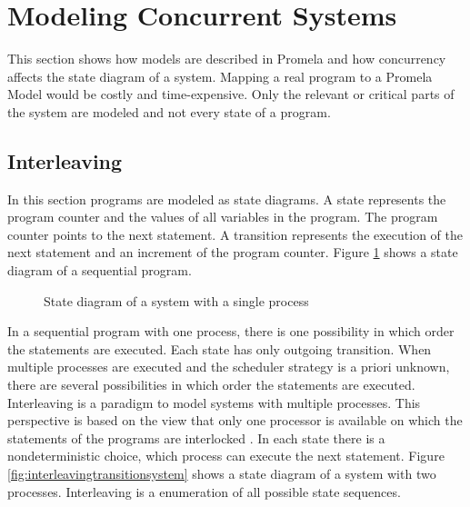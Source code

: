 \documentclass[a4paper, twoside]{article}
\begin{document}
\section{Modeling Concurrent Systems}
\label{sec:concurrency}

This section shows how models are described in Promela and how concurrency affects the state diagram of a system. Mapping a real program to a Promela Model would be costly and time-expensive. Only the relevant or critical parts of the system are modeled and not every state of a program.


\subsection{Interleaving}
\label{sec:interleaving}

In this section programs are modeled as state diagrams. A state represents the program counter and the values of all variables in the program. The program counter points to the next statement. A transition represents the execution of the next statement and an increment of the program counter. Figure \ref{fig:sequencielstatediagram} shows a state diagram of a sequential program. 

\begin{figure}
 \centering

  \caption{State diagram of a system with a single process}
  \label{fig:sequencielstatediagram}
\end{figure}

In a sequential program with one process, there is one possibility in which order the statements are executed. Each state has only outgoing transition. When multiple processes are executed and the scheduler strategy is a priori unknown, there are several possibilities in which order the statements are executed. Interleaving is a paradigm to model systems with multiple processes. This perspective is based on the view that only one processor is available on which the statements of the programs are interlocked \cite{baier08}. In each state there is a nondeterministic choice, which process can execute the next statement. Figure \ref{fig:interleavingtransitionsystem} shows a state diagram of a system with two processes. Interleaving is a enumeration of all possible state sequences.
\end{document}
